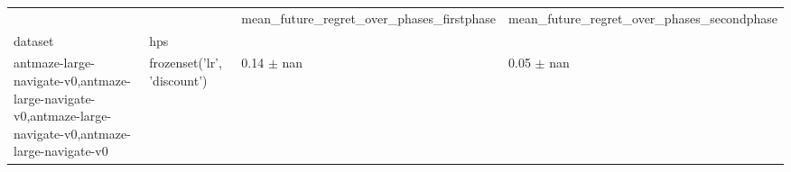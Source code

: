 \begin{tabular}{llll}
\toprule
 &  & mean_future_regret_over_phases_firstphase & mean_future_regret_over_phases_secondphase \\
dataset & hps &  &  \\
\midrule
antmaze-large-navigate-v0,antmaze-large-navigate-v0,antmaze-large-navigate-v0,antmaze-large-navigate-v0 & frozenset({'lr', 'discount'}) & 0.14 $\pm$ nan & 0.05 $\pm$ nan \\
\cline{1-4}
\bottomrule
\end{tabular}
